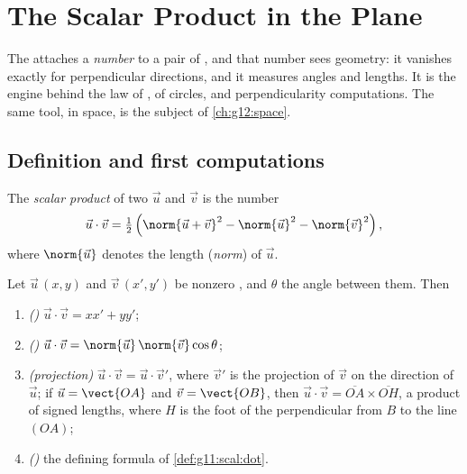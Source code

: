 \chapter{The Scalar Product in the Plane}\label{ch:g11:scal}

The  attaches a \emph{number} to a pair of , and that
number sees geometry: it vanishes exactly for perpendicular directions,
and it measures angles and lengths. It is the engine behind the law of
,  of circles, and perpendicularity computations. The same
tool, in space, is the subject of \cref{ch:g12:space}.

\section{Definition and first computations}

\begin{definition}\label{def:g11:scal:dot}
The \emph{scalar product} of two  $\vec u$
and $\vec v$ is the number
\[
\vec u \cdot \vec v
= \tfrac12\left(\norm{\vec u + \vec v}^2 - \norm{\vec u}^2
- \norm{\vec v}^2\right),
\]
where $\norm{\vec u}$ denotes the length (\emph{norm}) of $\vec u$.
\end{definition}

\begin{theorem}\label{thm:g11:scal:faces}
Let $\vec u\,(x, y)$ and $\vec v\,(x', y')$ be nonzero , and
$\theta$ the angle between them. Then
\begin{enumerate}
  \item \emph{()} $\vec u \cdot \vec v = xx' + yy'$;
  \item \emph{()} $\vec u \cdot \vec v =
        \norm{\vec u}\,\norm{\vec v}\cos\theta$;
  \item \emph{(projection)} $\vec u \cdot \vec v = \vec u \cdot \vec v'$,
        where $\vec v'$ is the  projection of $\vec v$ on the
        direction of $\vec u$; if $\vec u = \vect{OA}$ and
        $\vec v = \vect{OB}$, then
        $\vec u \cdot \vec v = \overline{OA} \times \overline{OH}$, a
        product of signed lengths, where $H$ is the foot of the
        perpendicular from $B$ to the line $(OA)$;
  \item \emph{()} the defining formula of \cref{def:g11:scal:dot}.
\end{enumerate}
\end{theorem}

